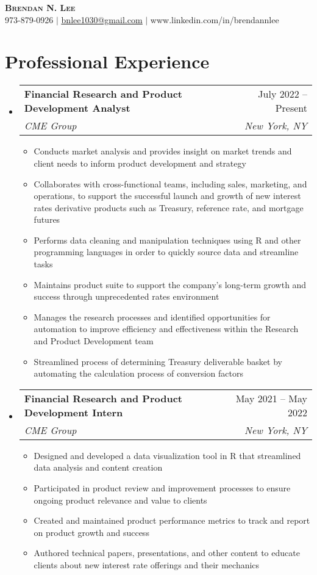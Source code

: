 \documentclass[letterpaper,11pt]{article}
\makeatletter
\newcommand{\resumeItem}[1]{
  \item\small{
    {#1 \vspace{-2pt}}
  }
}
\newcommand{\resumeSubheading}[4]{
  \vspace{-2pt}\item
    \begin{tabular*}{0.97\textwidth}[t]{l@{\extracolsep{\fill}}r}
      \textbf{#1} & #2 \\
      \textit{\small#3} & \textit{\small #4} \\
    \end{tabular*}\vspace{-7pt}
}
\newcommand{\resumeSubHeadingListStart}{\begin{itemize}[leftmargin=0.15in, label={}]}
\newcommand{\resumeSubHeadingListEnd}{\end{itemize}}
\newcommand{\resumeItemListStart}{\begin{itemize}}
\newcommand{\resumeItemListEnd}{\end{itemize}\vspace{-5pt}}
\makeatother
\begin{document}

\begin{center}
    \textbf{\Huge \scshape Brendan N. Lee} \\ \vspace{1pt}
    \small 973-879-0926 $|$ \href{mailto:x@x.com}{\underline{bnlee1030@gmail.com}} $|$ 
    \small{{www.linkedin.com/in/brendannlee}}
\end{center}



 
\section{Professional Experience}
  \resumeSubHeadingListStart
    \resumeSubheading
      {Financial Research and Product Development Analyst}{July 2022 -- Present}
      {CME Group}{New York, NY}
      \resumeItemListStart
        \resumeItem{Conducts market analysis and provides insight on market trends and client needs to inform product development and strategy}
        \resumeItem{Collaborates with cross-functional teams, including sales, marketing, and operations, to support the successful launch and growth of new interest rates derivative products such as Treasury, reference rate, and mortgage futures}
        \resumeItem{Performs data cleaning and manipulation techniques using R and other programming languages in order to quickly source data and streamline tasks}
        \resumeItem{Maintains product suite to support the company's long-term growth and success through unprecedented rates environment}
        \resumeItem{Manages the research processes and identified opportunities for automation to improve efficiency and effectiveness within the Research and Product Development team}
        \resumeItem{Streamlined process of determining Treasury deliverable basket by automating the calculation process of conversion factors}
      \resumeItemListEnd
      
    \resumeSubheading
      {Financial Research and Product Development Intern}{May 2021 -- May 2022}
      {CME Group}{New York, NY}
      \resumeItemListStart
        \resumeItem{Designed and developed a data visualization tool in R that streamlined data analysis and content creation}
        \resumeItem{Participated in product review and improvement processes to ensure ongoing product relevance and value to clients}
        \resumeItem{Created and maintained product performance metrics to track and report on product growth and success}
        \resumeItem{Authored technical papers, presentations, and other content to educate clients about new interest rate offerings and their mechanics}
      \resumeItemListEnd
  \resumeSubHeadingListEnd
\end{document}
